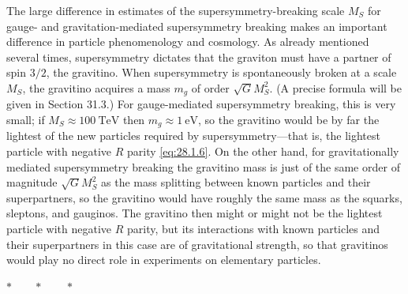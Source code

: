 The large difference in estimates of the supersymmetry-breaking scale
\(M_S\) for gauge- and gravitation-mediated supersymmetry breaking makes an
important difference in particle phenomenology and cosmology. As already
mentioned several times, supersymmetry dictates that the graviton must have
a partner of spin \(3/2\), the gravitino. When supersymmetry is spontaneously
broken at a scale \(M_S\), the gravitino acquires a mass \(m_g\) of order
\(\sqrt{G}M_S^2\). (A precise formula will be given in Section 31.3.) For
gauge-mediated supersymmetry breaking, this is very small; if
\(M_S\approx100\ \mathrm{TeV}\) then \(m_g\approx1\ \mathrm{eV}\), so the
gravitino would be by far the lightest of the new particles required by
supersymmetry---that is, the lightest particle with negative \(R\) parity
\eqref{eq:28.1.6}. On the other hand, for gravitationally mediated
supersymmetry breaking the gravitino mass is just of the same order of
magnitude \(\sqrt{G}M_S^2\) as the mass splitting between known particles
and their superpartners, so the gravitino would have roughly the same mass
as the squarks, sleptons, and gauginos. The gravitino then might or might
not be the lightest particle with negative \(R\) parity, but its
interactions with known particles and their superpartners in this case are
of gravitational strength, so that gravitinos would play no direct role in
experiments on elementary particles.

\begin{center}
\(\ast\qquad\ast\qquad\ast\)
\end{center}

